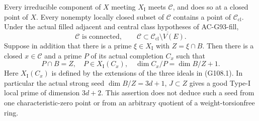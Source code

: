 \begin{theorem}
\label{AC-G108-geometry}
Every irreducible component of $X$ meeting $X_{\mathrm I}$ meets
$\mathcal C$, and does so at a closed point of $X$.  Every nonempty
locally closed subset of $\mathcal C$ contains a point of
$\mathcal C_{\mathrm{cl}}$.  Under the actual filled adjacent and
central class hypotheses of AC-G93-fill,
\[
 \mathcal C\text{ is connected},\qquad
 \mathcal C\subset
 \overline{\mathcal C_{\mathrm{cl}}\setminus V(E)}.
 \tag{G108.4}
\]
Suppose in addition that there is a prime $\xi\in X_{\mathrm I}$
with $Z=\xi\cap B$.  Then there is a closed $x\in\mathcal C$
and a prime $P$ of its actual completion $C_x$ such that
\[
 P\cap B=Z,\quad P\in X_{\mathrm I}(C_x),\quad
 \dim C_x/P=\dim B/Z+1.
 \tag{G108.5}
\]
Here $X_{\mathrm I}(C_x)$ is defined by the extensions of the three
ideals in (G108.1).  In particular the actual strong seed
$\dim B/Z=3d+1$, $J\subset Z$ gives a good Type-I local prime of
dimension $3d+2$.  This assertion does not deduce such a seed from
one characteristic-zero point or from an arbitrary quotient of a
weight-torsionfree ring.
\end{theorem}

